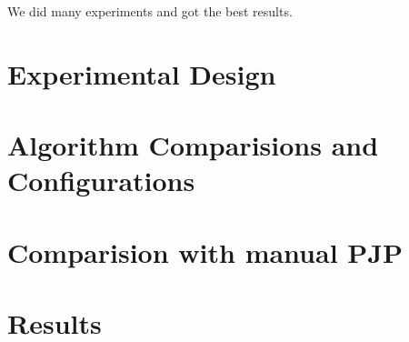 We did many experiments and got the best results.

\section{Experimental Design}

\section{Algorithm Comparisions and Configurations}

\section{Comparision with manual PJP}

\section{Results}